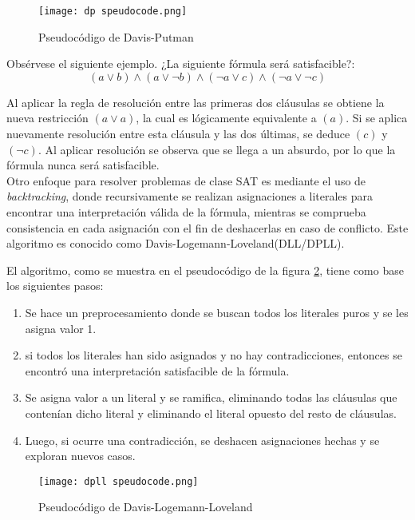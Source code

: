 \documentclass[12pt]{report}
\begin{document}
\begin{figure}[ht]
    \centering
    \texttt{[image: dp speudocode.png]}
    \caption{Pseudocódigo de Davis-Putman}
    \label{fig:dp}
\end{figure}


Obsérvese el siguiente ejemplo. ¿La siguiente fórmula será satisfacible?:
$$(a\lor  b) \land(a\lor  \neg b) \land (\neg a\lor  c) \land(\neg a\lor  \neg c)$$

Al aplicar la regla de resolución entre las primeras dos cláusulas se obtiene la nueva restricción $(a \lor  a)$, la cual es lógicamente equivalente a $(a)$. Si se aplica nuevamente resolución entre esta cláusula y las dos últimas, se deduce $(c)$ y $(\neg c)$. Al aplicar resolución se observa que se llega a un absurdo, por lo que la fórmula nunca será satisfacible. \\

Otro enfoque para resolver problemas de clase SAT es mediante el uso de \textit{backtracking}, donde recursivamente se realizan asignaciones a literales para encontrar una interpretación válida de la fórmula, mientras se comprueba consistencia en cada asignación con el fin de deshacerlas en caso de conflicto. Este algoritmo es conocido como Davis-Logemann-Loveland(DLL/DPLL).

El algoritmo, como se muestra en el pseudocódigo de la figura \ref{fig:dpll pc}, tiene como base los siguientes pasos:
\begin{enumerate}
    \item Se hace un preprocesamiento donde se buscan todos los literales puros y se les asigna valor 1.
    \item si todos los literales han sido asignados y no hay contradicciones, entonces se encontró una interpretación satisfacible de la fórmula.
    \item Se asigna valor a un literal y se ramifica, eliminando todas las cláusulas que contenían dicho literal y eliminando el literal opuesto del resto de cláusulas.
    \item Luego, si ocurre una contradicción, se deshacen asignaciones hechas y se exploran nuevos casos.\\
\end{enumerate}

\begin{figure}[ht]
    \centering
    \texttt{[image: dpll speudocode.png]}
    \caption{Pseudocódigo de Davis-Logemann-Loveland}
    \label{fig:dpll pc}
\end{figure}
\end{document}
